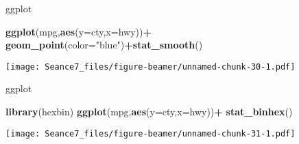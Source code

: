 \documentclass[ignorenonframetext,]{beamer}
\newenvironment{Shaded}{\begin{snugshade}}{\end{snugshade}}
\newcommand{\DataTypeTok}[1]{\textcolor[rgb]{0.13,0.29,0.53}{#1}}
\newcommand{\KeywordTok}[1]{\textcolor[rgb]{0.13,0.29,0.53}{\textbf{#1}}}
\newcommand{\NormalTok}[1]{#1}
\newcommand{\OperatorTok}[1]{\textcolor[rgb]{0.81,0.36,0.00}{\textbf{#1}}}
\newcommand{\StringTok}[1]{\textcolor[rgb]{0.31,0.60,0.02}{#1}}
\begin{document}
\begin{frame}[fragile]{ggplot}
\protect\hypertarget{ggplot-8}{}

\begin{Shaded}
\begin{Highlighting}[]
\KeywordTok{ggplot}\NormalTok{(mpg,}\KeywordTok{aes}\NormalTok{(}\DataTypeTok{y=}\NormalTok{cty,}\DataTypeTok{x=}\NormalTok{hwy))}\OperatorTok{+}
\StringTok{  }\KeywordTok{geom_point}\NormalTok{(}\DataTypeTok{color=}\StringTok{"blue"}\NormalTok{)}\OperatorTok{+}\KeywordTok{stat_smooth}\NormalTok{()}
\end{Highlighting}
\end{Shaded}

\texttt{[image: Seance7\_files/figure-beamer/unnamed-chunk-30-1.pdf]}

\end{frame}

\begin{frame}[fragile]{ggplot}
\protect\hypertarget{ggplot-9}{}

\begin{Shaded}
\begin{Highlighting}[]
\KeywordTok{library}\NormalTok{(hexbin)}
\KeywordTok{ggplot}\NormalTok{(mpg,}\KeywordTok{aes}\NormalTok{(}\DataTypeTok{y=}\NormalTok{cty,}\DataTypeTok{x=}\NormalTok{hwy))}\OperatorTok{+}
\StringTok{  }\KeywordTok{stat_binhex}\NormalTok{()}
\end{Highlighting}
\end{Shaded}

\texttt{[image: Seance7\_files/figure-beamer/unnamed-chunk-31-1.pdf]}

\end{frame}
\end{document}
